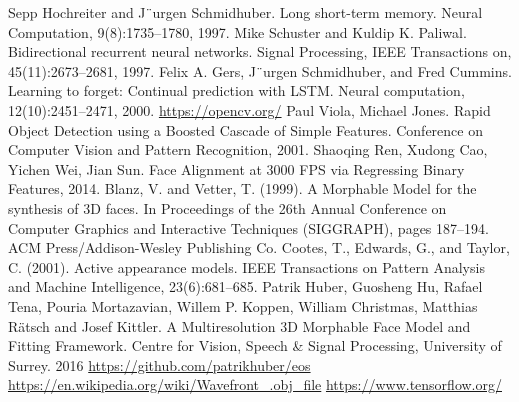 \documentclass[a4paper, openany, oneside, 11pt]{book}
\begin{document}
\begin{thebibliography}{99}
Sepp Hochreiter and J¨urgen Schmidhuber. Long short-term memory. Neural Computation, 9(8):1735–1780, 1997.
Mike Schuster and Kuldip K. Paliwal. Bidirectional recurrent neural networks.
Signal Processing, IEEE Transactions on, 45(11):2673–2681, 1997.
Felix A. Gers, J¨urgen Schmidhuber, and Fred Cummins. Learning to forget:
Continual prediction with LSTM. Neural computation, 12(10):2451–2471,
2000.
\url{https://opencv.org/}
Paul Viola, Michael Jones. Rapid Object Detection using a Boosted Cascade of Simple Features. Conference on Computer Vision and Pattern Recognition, 2001.
Shaoqing Ren, Xudong Cao, Yichen Wei, Jian Sun. Face Alignment at 3000 FPS via Regressing Binary Features, 2014.
Blanz, V. and Vetter, T. (1999). A Morphable Model for the
synthesis of 3D faces. In Proceedings of the 26th Annual Conference on Computer Graphics and Interactive Techniques (SIGGRAPH), pages 187–194. ACM
Press/Addison-Wesley Publishing Co.
Cootes, T., Edwards, G., and Taylor, C. (2001). Active appearance models. IEEE Transactions on Pattern Analysis and Machine Intelligence, 23(6):681–685.
Patrik Huber, Guosheng Hu, Rafael Tena, Pouria Mortazavian, Willem P. Koppen, William Christmas, Matthias R{\"a}tsch and Josef Kittler. A Multiresolution 3D Morphable Face Model and Fitting Framework. Centre for Vision, Speech \& Signal Processing, University of Surrey. 2016
\url{https://github.com/patrikhuber/eos}
\url{https://en.wikipedia.org/wiki/Wavefront_.obj_file}
\url{https://www.tensorflow.org/}
\end{thebibliography}

\newpage
\listoffigures

\newpage
{}
\printglossary[title=Spisak skrac1enica, type=\acronymtype]
\end{document}
